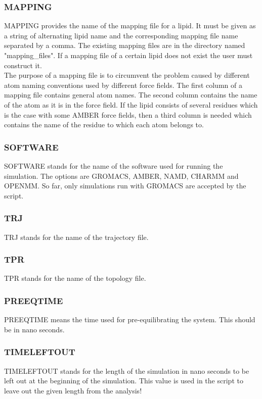 \documentclass[12pt,a4paper]{article}
\begin{document}
\subsubsection*{MAPPING}
MAPPING provides the name of the mapping file for a lipid. It must be given as a string of alternating lipid name and the corresponding mapping file name separated by a comma. The existing mapping files are in the directory named "mapping\_files". If a mapping file of a certain lipid does not exist the user must construct it.
\newline \\
The purpose of a mapping file is to circumvent the problem caused by different atom naming conventions used by different force fields. The first column of a mapping file contains general atom names. The second column contains the name of the atom as it is in the force field. If the lipid consists of several residues which is the case with some AMBER force fields, then a third column is needed which contains the name of the residue to which each atom belongs to.

\subsubsection*{SOFTWARE}
SOFTWARE stands for the name of the software used for running the simulation. The options are GROMACS, AMBER, NAMD, CHARMM and OPENMM. So far, only simulations run with GROMACS are accepted by the script.

\subsubsection*{TRJ}
TRJ stands for the name of the trajectory file.
\subsubsection*{TPR}
TPR stands for the name of the topology file.

\subsubsection*{PREEQTIME}
PREEQTIME means the time used for pre-equilibrating the system. This should be in nano seconds. 
\subsubsection*{TIMELEFTOUT}
TIMELEFTOUT stands for the length of the simulation in nano seconds to be left out at the beginning of the simulation. This value is used in the script to leave out the given length from the analysis!
\end{document}

